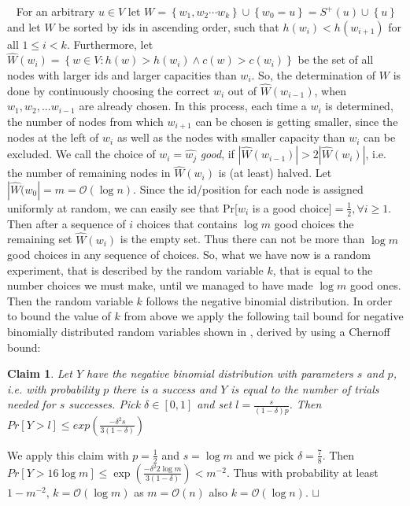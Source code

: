 \documentclass[11pt]{article}
\newtheorem{claim}[theorem]{Claim}
\newcommand{\sq}{\hbox{\rlap{$\sqcap$}$\sqcup$}}
\newcommand{\qed}{\hspace*{\fill}\sq}
\newenvironment{proof}{\noindent {\bf Proof.}\ }{\qed\par\vskip 4mm\par}
\begin{document}
\begin{proof}
For an arbitrary $u\in V$ let $W=\left\{w_1,w_2\cdots w_k\right\}\cup \left\{w_0 =u\right\}= S^+(u)\cup \left\{u\right\}$ and let $W$ be sorted by ids in ascending order, such that $h(w_i)<h(w_{i+1})$ for all $1\leq i<k$. Furthermore, let $\hat{W}(w_i)=\left\{w\in V:h(w)>h(w_i) \wedge c(w)>c(w_i)\right\}$ be the set of all nodes with larger ids and larger capacities than $w_i$.
So, the determination of $W$ is done by continuously choosing the correct $w_i$ out of $\hat{W}(w_{i-1})$, when $w_1,w_2,...w_{i-1}$ are already chosen.
In this process, each time a $w_i$ is determined, the number of nodes from which $w_{i+1}$ can be chosen is getting smaller, since the nodes at the left of $w_i$ as well as the nodes with smaller capacity than $w_i$ can be excluded.
We call the choice of $w_i=\hat{w_j}$ \emph{good}, if $|\hat{W}(w_{i-1})|>2|\hat{W}(w_i)|$, i.e. the number of remaining nodes in $\hat{W}(w_i)$ is (at least) halved. Let $|\hat{W}(w_{0}|=m=\mathcal O(\log n)$. Since the id/position for each node is assigned uniformly at random, we can easily see that Pr[$w_i$ is a good choice]$= \frac{1}{2}, \forall i\geq 1$.
Then after a sequence of $i$ choices that contains $\log m$ good choices the remaining set $\hat{W}(w_i)$ is the empty set. Thus there can not be more than $\log m$ good choices in any sequence of choices.
So, what we have now is a random experiment, that is described by the random variable $k$, that is equal to the number choices we must make, until we managed to have made $\log m$ good ones. Then the random variable $k$ follows the negative binomial distribution.
In order to bound the value of $k$ from above we apply the following tail bound for negative binomially distributed random variables shown in \cite{NegBi}, derived by using a Chernoff bound:

\begin{claim}
Let $Y$ have the negative binomial distribution with parameters $s$ and $p$, i.e. with probability $p$ there is a success and $Y$ is equal to the number of trials needed for $s$ successes. Pick $\delta \in [0,1]$ and set $l=\frac{s}{(1-\delta)p}$. Then $Pr[Y>l]\leq exp(\frac{-\delta^{2}s}{3(1-\delta)})$
\end{claim}

We apply this claim with $p=\frac{1}{2}$ and $s=\log m$ and we pick $\delta=\frac{7}{8}$. Then $Pr[Y>16\log m]\leq \exp(\frac{-\delta^{2}2\log m}{3(1-\delta)})<m^{- 2}$. Thus with probability at least $1-m^{- 2}$, $k=\mathcal O(\log m)$ as $m=\mathcal O(n)$ also $k=\mathcal O(\log n)$.
\end{proof}
\end{document}
